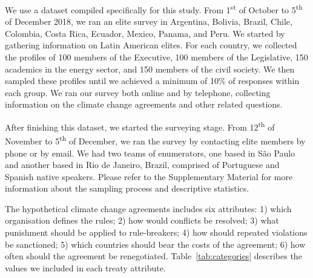 \documentclass[a4paper,12pt]{article}
\begin{document}
We use a dataset compiled specifically for this study. From 1\textsuperscript{st} of October to 5\textsuperscript{th} of December 2018, we ran an elite survey in Argentina, Bolivia, Brazil, Chile, Colombia, Costa Rica, Ecuador, Mexico, Panama, and Peru. We started by gathering information on Latin American elites. For each country, we collected the profiles of 100 members of the Executive, 100 members of the Legislative, 150 academics in the energy sector, and 150 members of the civil society. We then sampled these profiles until we achieved a minimum of 10\% of responses within each group. We ran our survey both online and by telephone, collecting information on the climate change agreements and other related questions.

After finishing this dataset, we started the surveying stage. From 12\textsuperscript{th} of November to 5\textsuperscript{th} of December, we ran the survey by contacting elite members by phone or by email. We had two teams of enumerators, one based in S\~{a}o Paulo and another based in Rio de Janeiro, Brazil, comprised of Portuguese and Spanish native speakers. Please refer to the Supplementary Material for more information about the sampling process and descriptive statistics.

The hypothetical climate change agreements includes six attributes: 1) which organisation defines the rules; 2) how would conflicts be resolved; 3) what punishment should be applied to rule-breakers; 4) how should repeated violations be sanctioned; 5) which countries should bear the costs of the agreement; 6) how often should the agreement be renegotiated. Table~\ref{tab:categories} describes the values we included in each treaty attribute. \\

\newpage 
\end{document}
